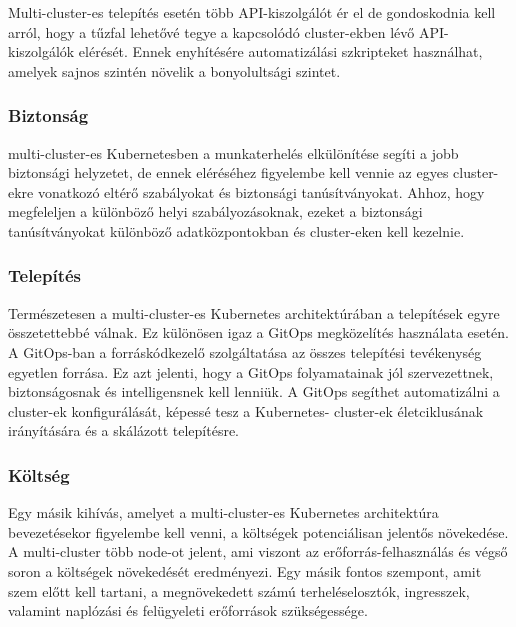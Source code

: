 Multi-cluster-es telepítés esetén több API-kiszolgálót ér el de gondoskodnia kell arról, hogy a tűzfal lehetővé tegye a kapcsolódó cluster-ekben lévő API-kiszolgálók elérését. Ennek enyhítésére automatizálási szkripteket használhat, amelyek sajnos szintén növelik a bonyolultsági szintet.
\cite{multicluster}

\subsubsection*{Biztonság}
multi-cluster-es Kubernetesben a munkaterhelés elkülönítése segíti a jobb biztonsági helyzetet, de ennek eléréséhez figyelembe kell vennie az egyes cluster-ekre vonatkozó eltérő szabályokat és biztonsági tanúsítványokat. Ahhoz, hogy megfeleljen a különböző helyi szabályozásoknak, ezeket a biztonsági tanúsítványokat különböző adatközpontokban és cluster-eken kell kezelnie.
\cite{multicluster}

\subsubsection*{Telepítés}
Természetesen a multi-cluster-es Kubernetes architektúrában a telepítések egyre összetettebbé válnak. Ez különösen igaz a GitOps megközelítés használata esetén. A GitOps-ban a forráskódkezelő szolgáltatása az összes telepítési tevékenység egyetlen forrása. Ez azt jelenti, hogy a GitOps folyamatainak jól szervezettnek, biztonságosnak és intelligensnek kell lenniük. A GitOps segíthet automatizálni a cluster-ek konfigurálását, képessé tesz a Kubernetes- cluster-ek életciklusának irányítására és a skálázott telepítésre.
\cite{multicluster}

\subsubsection*{Költség}
Egy másik kihívás, amelyet a multi-cluster-es Kubernetes architektúra bevezetésekor figyelembe kell venni, a költségek potenciálisan jelentős növekedése. A multi-cluster több node-ot jelent, ami viszont az erőforrás-felhasználás és végső soron a költségek növekedését eredményezi. Egy másik fontos szempont, amit szem előtt kell tartani, a megnövekedett számú terheléselosztók, ingresszek, valamint naplózási és felügyeleti erőforrások szükségessége.
\cite{multicluster}
